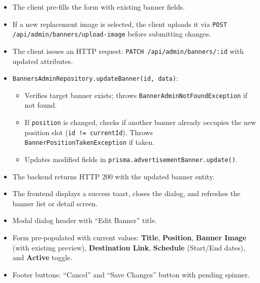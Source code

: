 \begin{itemize}[leftmargin=1.6em,topsep=3pt,itemsep=2pt,parsep=0pt,label=$\bullet$]
    \item The client pre-fills the form with existing banner fields.
    \item If a new replacement image is selected, the client uploads it via \texttt{POST /\allowbreak{}api/\allowbreak{}admin/\allowbreak{}banners/\allowbreak{}upload-\allowbreak{}image} before submitting changes.
    \item The client issues an HTTP request: \texttt{PATCH /\allowbreak{}api/\allowbreak{}admin/\allowbreak{}banners/\allowbreak{}:\allowbreak{}id} with updated attributes.
    \item \texttt{Banners\allowbreak{}Admin\allowbreak{}Repository.\allowbreak{}updateBanner(\allowbreak{}id, data)}:
        \begin{itemize}[leftmargin=1.6em,topsep=2pt,itemsep=2pt,parsep=0pt]
            \item Verifies target banner exists; throws \texttt{BannerAdminNotFoundException} if not found.
            \item If \texttt{position} is changed, checks if another banner already occupies the new position slot (\texttt{id != currentId}). Throws \texttt{BannerPositionTakenException} if taken.
            \item Updates modified fields in \texttt{prisma.advertisementBanner.update()}.
        \end{itemize}
    \item The backend returns HTTP 200 with the updated banner entity.
    \item The frontend displays a success toast, closes the dialog, and refreshes the banner list or detail screen.
\end{itemize}

\begin{itemize}[leftmargin=1.6em,topsep=3pt,itemsep=2pt,parsep=0pt,label=$\bullet$]
    \item Modal dialog header with ``Edit Banner'' title.
    \item Form pre-populated with current values: \textbf{Title}, \textbf{Position}, \textbf{Banner Image} (with existing preview), \textbf{Destination Link}, \textbf{Schedule} (Start/End dates), and \textbf{Active} toggle.
    \item Footer buttons: ``Cancel'' and ``Save Changes'' button with pending spinner.
\end{itemize}

